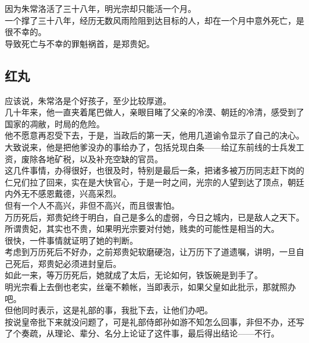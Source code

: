 \begin{multicols}{\theparacolNo}
因为朱常洛活了三十八年，明光宗却只能活一个月。\\

一个撑了三十八年，经历无数风雨险阻到达目标的人，却在一个月中意外死亡，是很不幸的。\\

导致死亡与不幸的罪魁祸首，是郑贵妃。\\

\subsection{红丸}
应该说，朱常洛是个好孩子，至少比较厚道。\\

几十年来，他一直夹着尾巴做人，亲眼目睹了父亲的冷漠、朝廷的冷清，感受到了国家的凋敝，时局的危险。\\

他不愿意再忍受下去，于是，当政后的第一天，他用几道谕令显示了自己的决心。\\

大致说来，他是把他爹没办的事给办了，包括兑现白条——给辽东前线的士兵发工资，废除各地矿税，以及补充空缺的官员。\\

这几件事情，办得很好，也很及时，特别是最后一条，把诸多被万历同志赶下岗的仁兄们拉了回来，实在是大快官心，于是一时之间，光宗的人望到达了顶点，朝廷内外无不感恩戴德，兴高采烈。\\

但有一个人不高兴，非但不高兴，而且很害怕。\\

万历死后，郑贵妃终于明白，自己是多么的虚弱，今日之城内，已是敌人之天下。所谓贵妃，其实也不贵，如果明光宗要对付她，贱卖的可能性是相当的大。\\

很快，一件事情就证明了她的判断。\\

考虑到万历死后不好办，之前郑贵妃软磨硬泡，让万历下了道遗嘱，讲明，一旦自己死后，郑贵妃必须进封皇后。\\

如此一来，等万历死后，她就成了太后，无论如何，铁饭碗是到手了。\\

明光宗看上去倒也老实，丝毫不赖帐，当即表示，如果父皇如此批示，那就照办吧。\\

但他同时表示，这是礼部的事，我批下去，让他们办吧。\\

按说皇帝批下来就没问题了，可是礼部侍郎孙如游不知怎么回事，非但不办，还写了个奏疏，从理论、辈分、名分上论证了这件事，最后得出结论——不行。\\


\end{multicols}
